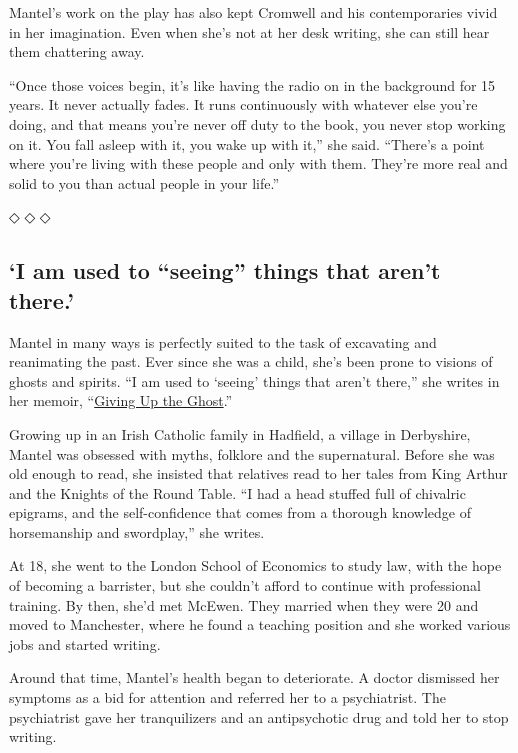 Mantel's work on the play has also kept Cromwell and his contemporaries
vivid in her imagination. Even when she's not at her desk writing, she
can still hear them chattering away.

``Once those voices begin, it's like having the radio on in the
background for 15 years. It never actually fades. It runs continuously
with whatever else you're doing, and that means you're never off duty to
the book, you never stop working on it. You fall asleep with it, you
wake up with it,'' she said. ``There's a point where you're living with
these people and only with them. They're more real and solid to you than
actual people in your life.''

◇ ◇ ◇

\hypertarget{i-am-used-to-seeing-things-that-arent-there}{%
\subsection{`I am used to ``seeing'' things that aren't
there.'}\label{i-am-used-to-seeing-things-that-arent-there}}

Mantel in many ways is perfectly suited to the task of excavating and
reanimating the past. Ever since she was a child, she's been prone to
visions of ghosts and spirits. ``I am used to `seeing' things that
aren't there,'' she writes in her memoir,
``\href{https://www.nytimes3xbfgragh.onion/2003/10/05/books/unsuited-to-everything.html}{Giving
Up the Ghost}.''

Growing up in an Irish Catholic family in Hadfield, a village in
Derbyshire, Mantel was obsessed with myths, folklore and the
supernatural. Before she was old enough to read, she insisted that
relatives read to her tales from King Arthur and the Knights of the
Round Table. ``I had a head stuffed full of chivalric epigrams, and the
self-confidence that comes from a thorough knowledge of horsemanship and
swordplay,'' she writes.

At 18, she went to the London School of Economics to study law, with the
hope of becoming a barrister, but she couldn't afford to continue with
professional training. By then, she'd met McEwen. They married when they
were 20 and moved to Manchester, where he found a teaching position and
she worked various jobs and started writing.

Around that time, Mantel's health began to deteriorate. A doctor
dismissed her symptoms as a bid for attention and referred her to a
psychiatrist. The psychiatrist gave her tranquilizers and an
antipsychotic drug and told her to stop writing.

